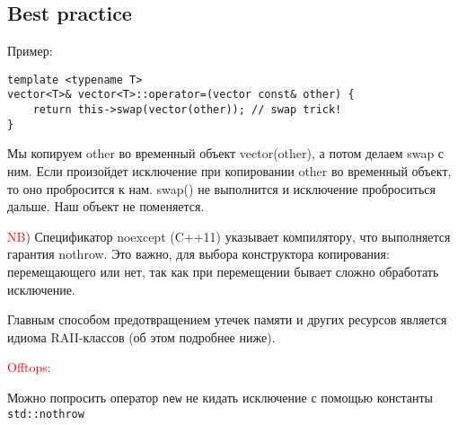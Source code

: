 \subsection{Best practice}

Пример:
\begin{verbatim}
template <typename T>
vector<T>& vector<T>::operator=(vector const& other) {
    return this->swap(vector(other)); // swap trick!
}
\end{verbatim}

Мы копируем other во временный объект vector(other), а потом делаем swap с ним. Если произойдет исключение при копировании other во временный объект, то оно пробросится к нам. swap() не выполнится и исключение проброситься дальше. Наш объект не поменяется.

\textcolor{red}{NB}) Спецификатор noexcept (C++11) указывает компилятору, что выполняется гарантия nothrow. Это важно, для выбора конструктора копирования: перемещающего или нет, так как при перемещении бывает сложно обработать исключение.

Главным способом предотвращением утечек памяти и других ресурсов является идиома RAII-классов (об этом подробнее ниже).

\textcolor{red}{Offtops:}

Можно попросить оператор \texttt{new} не кидать исключение с помощью константы \texttt{std::nothrow}
